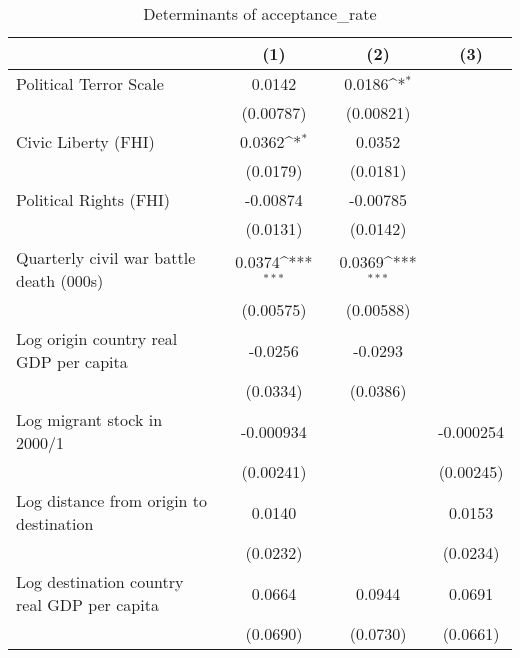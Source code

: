\begin{table}[htbp]\centering
\def\sym#1{\ifmmode^{#1}\else\(^{#1}\)\fi}
\caption{Determinants of acceptance\_rate}
\begin{tabular}{l*{3}{c}}
\hline\hline
                    &\multicolumn{1}{c}{(1)}         &\multicolumn{1}{c}{(2)}         &\multicolumn{1}{c}{(3)}         \\
\hline
Political Terror Scale&      0.0142         &      0.0186\sym{*}  &                     \\
                    &   (0.00787)         &   (0.00821)         &                     \\
[1em]
Civic Liberty (FHI) &      0.0362\sym{*}  &      0.0352         &                     \\
                    &    (0.0179)         &    (0.0181)         &                     \\
[1em]
Political Rights (FHI)&    -0.00874         &    -0.00785         &                     \\
                    &    (0.0131)         &    (0.0142)         &                     \\
[1em]
Quarterly civil war battle death (000s)&      0.0374\sym{***}&      0.0369\sym{***}&                     \\
                    &   (0.00575)         &   (0.00588)         &                     \\
[1em]
Log origin country real GDP per capita&     -0.0256         &     -0.0293         &                     \\
                    &    (0.0334)         &    (0.0386)         &                     \\
[1em]
Log migrant stock in 2000/1&   -0.000934         &                     &   -0.000254         \\
                    &   (0.00241)         &                     &   (0.00245)         \\
[1em]
Log distance from origin to destination&      0.0140         &                     &      0.0153         \\
                    &    (0.0232)         &                     &    (0.0234)         \\
[1em]
Log destination country real GDP per capita&      0.0664         &      0.0944         &      0.0691         \\
                    &    (0.0690)         &    (0.0730)         &    (0.0661)         \\

\end{tabular}
\end{table}
